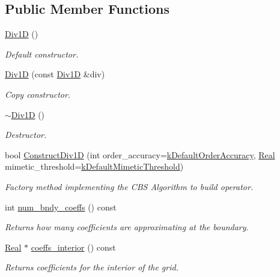 \subsection*{Public Member Functions}
\begin{DoxyCompactItemize}
\item 
\hyperlink{classmtk_1_1Div1D_a339c66dd4ed8f50cbeda3645de18e5ab}{Div1\+D} ()
\begin{DoxyCompactList}\small\item\em Default constructor. \end{DoxyCompactList}\item 
\hyperlink{classmtk_1_1Div1D_a25376152cf97aa27f6b61bcb62b4ea7a}{Div1\+D} (const \hyperlink{classmtk_1_1Div1D}{Div1\+D} \&div)
\begin{DoxyCompactList}\small\item\em Copy constructor. \end{DoxyCompactList}\item 
\hyperlink{classmtk_1_1Div1D_ac2c215f42b8da513df2a4ee477b5fa1f}{$\sim$\+Div1\+D} ()
\begin{DoxyCompactList}\small\item\em Destructor. \end{DoxyCompactList}\item 
bool \hyperlink{classmtk_1_1Div1D_a52fcd1542f11e606e36bd188e48bfdf7}{Construct\+Div1\+D} (int order\+\_\+accuracy=\hyperlink{group__c01-roots_ga0d95560098eb36420511103637b6952f}{k\+Default\+Order\+Accuracy}, \hyperlink{group__c01-roots_gac080bbbf5cbb5502c9f00405f894857d}{Real} mimetic\+\_\+threshold=\hyperlink{group__c01-roots_ga35718d949bdc81a08a9cc8ebbe3478a2}{k\+Default\+Mimetic\+Threshold})
\begin{DoxyCompactList}\small\item\em Factory method implementing the C\+B\+S Algorithm to build operator. \end{DoxyCompactList}\item 
int \hyperlink{classmtk_1_1Div1D_a975cb2a91ed6806f6fc0a3a5b01b01b1}{num\+\_\+bndy\+\_\+coeffs} () const 
\begin{DoxyCompactList}\small\item\em Returns how many coefficients are approximating at the boundary. \end{DoxyCompactList}\item 
\hyperlink{group__c01-roots_gac080bbbf5cbb5502c9f00405f894857d}{Real} $\ast$ \hyperlink{classmtk_1_1Div1D_a0916b5e84b019b4b6a33d0a45d829513}{coeffs\+\_\+interior} () const 
\begin{DoxyCompactList}\small\item\em Returns coefficients for the interior of the grid. \end{DoxyCompactList}\item 

\end{DoxyCompactItemize}
